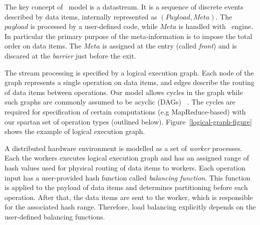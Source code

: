 
The key concept of \FlameStream\ model is a datastream. It is a sequence of discrete events described by data items, internally represented as 
$(Payload, Meta).$
The $payload$ is processed by a  user-defined code, while $Meta$ is handled with \FlameStream\ engine. In particular
the primary purpose of the meta-information is to impose the total order on data items. 
The  $Meta$ is assigned at the entry (called {\em  front}) and is discared at the {\em barrier} just before the exit. 

The stream processing is specified by a logical execution graph. 
Each node of the graph represents a single operation on data items, and edges describe the routing of data items between operations.  
Our model allows cycles in the graph while such graphs are commonly assumed to be acyclic (DAGs) 
~\cite{Zaharia:2016:ASU:3013530.2934664, Carbone:2017:SMA:3137765.3137777}. 
The cycles are required for specification of certain computations (e.g MapReduce-based) with our spartan set of operation types (outlined below).
Figure~\ref{logical-graph-figure} shows the example of logical execution graph.

A distributed hardware environment is modelled as a set of {\em worker} processes. 
Each the workers executes logical execution graph and has an assigned range of hash values used for physical routing of data items to workers. 
%
Each operation input has a user-provided hash function called {\it balancing function}. This function is applied to the payload of data items and determines partitioning before each operation. After that, the data items are sent to the worker, which is responsible for the associated hash range. Therefore, load balancing explicitly depends on the user-defined balancing functions. 

